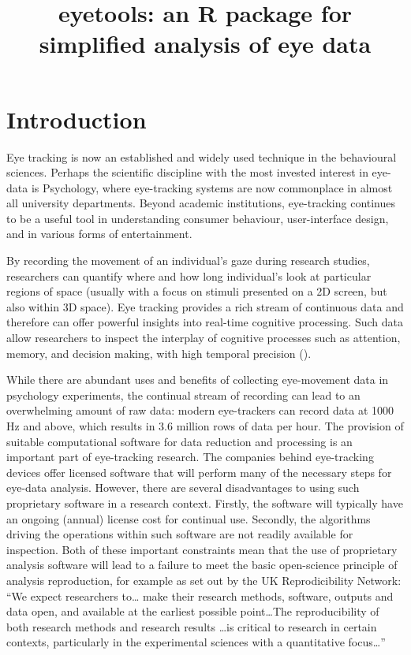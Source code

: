 \documentclass[
  man,
  floatsintext,
  longtable,
  nolmodern,
  notxfonts,
  notimes,
  colorlinks=true,linkcolor=blue,citecolor=blue,urlcolor=blue]{apa7}
\title{eyetools: an R package for simplified analysis of eye data}
\affiliation{
{Lancaster University}}
\begin{document}
\maketitle


\setcounter{secnumdepth}{-\maxdimen} %

\setlength\LTleft{0pt}

\resetlinenumber[1]

\section{Introduction}\label{introduction}

Eye tracking is now an established and widely used technique in the
behavioural sciences. Perhaps the scientific discipline with the most
invested interest in eye-data is Psychology, where eye-tracking systems
are now commonplace in almost all university departments. Beyond
academic institutions, eye-tracking continues to be a useful tool in
understanding consumer behaviour, user-interface design, and in various
forms of entertainment.

By recording the movement of an individual's gaze during research
studies, researchers can quantify where and how long individual's look
at particular regions of space (usually with a focus on stimuli
presented on a 2D screen, but also within 3D space). Eye tracking
provides a rich stream of continuous data and therefore can offer
powerful insights into real-time cognitive processing. Such data allow
researchers to inspect the interplay of cognitive processes such as
attention, memory, and decision making, with high temporal precision
().

While there are abundant uses and benefits of collecting eye-movement
data in psychology experiments, the continual stream of recording can
lead to an overwhelming amount of raw data: modern eye-trackers can
record data at 1000 Hz and above, which results in 3.6 million rows of
data per hour. The provision of suitable computational software for data
reduction and processing is an important part of eye-tracking research.
The companies behind eye-tracking devices offer licensed software that
will perform many of the necessary steps for eye-data analysis. However,
there are several disadvantages to using such proprietary software in a
research context. Firstly, the software will typically have an ongoing
(annual) license cost for continual use. Secondly, the algorithms
driving the operations within such software are not readily available
for inspection. Both of these important constraints mean that the use of
proprietary analysis software will lead to a failure to meet the basic
open-science principle of analysis reproduction, for example as set out
by the UK Reprodicibility Network: ``We expect researchers to\ldots{}
make their research methods, software, outputs and data open, and
available at the earliest possible point\ldots The reproducibility of
both research methods and research results \ldots is critical to
research in certain contexts, particularly in the experimental sciences
with a quantitative focus\ldots{}''
\end{document}
